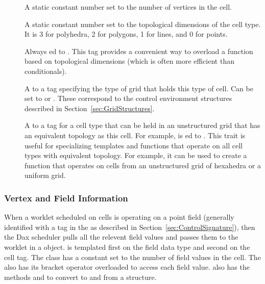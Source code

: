 \begin{description}
\item[]  A static
  constant number set to the number of vertices in the cell.
\item[]
   A static constant number set to the
  topological dimensions of the cell type. It is 3 for polyhedra, 2 for
  polygons, 1 for lines, and 0 for points.
\item[] 
  Always ed to
  \textcode{<}\textcode{>}.
  This tag provides a convenient way to overload a function based on
  topological dimensions (which is often more efficient than conditionals).
\item[]  A  to a tag
  specifying the type of grid that holds this type of cell. Can be set to
   or . These correspond to
  the control environment structures described in
  Section~\ref{sec:GridStructures}.
\item[]  A
   to a tag for a cell type that can be held in an
  unstructured grid that has an equivalent topology as this cell. For
  example,
  \textcode{<}
  is ed to . This trait is useful
  for specializing templates and functions that operate on all cell types
  with equivalent topology. For example, it can be used to create a
  function that operates on cells from an unstructured grid of hexahedra or
  a uniform grid.
\end{description}

\subsubsection{Vertex and Field Information}


When a worklet scheduled on cells is operating on a point field (generally
identified with a  tag in the \controlsignature as
described in Section~\ref{sec:ControlSignature}), then the Dax scheduler
pulls all the relevent field values and passes them to the worklet in a
 object.  is templated first
on the field data type and second on the cell tag. The
 class has a
 constant set to the
number of field values in the cell. The  also has
its bracket operator overloaded to access each field
value.  also has the methods
 and  to convert to and from a
 structure.

